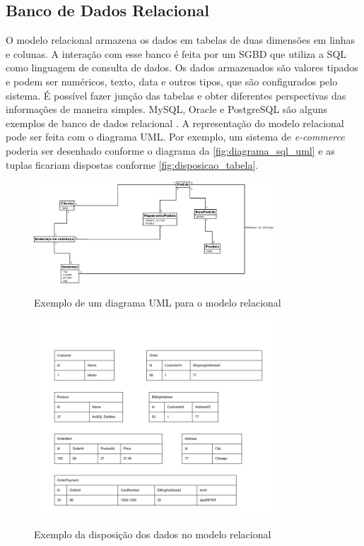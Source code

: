 \subsection{Banco de Dados Relacional}
\label{subsec:relationaldatabasetype}
O modelo relacional armazena os dados em tabelas de duas dimensões em linhas e colunas. A interação com esse banco é feita por um \ac{SGBD} que utiliza a \ac{SQL} como linguagem de consulta de dados. Os dados armazenados são valores tipados e podem ser numéricos, texto, data e outros tipos, que são configurados pelo sistema. É possível fazer junção das tabelas e obter diferentes perspectivas das informações de maneira simples. MySQL, Oracle e PostgreSQL são alguns exemplos de banco de dados relacional \cite{SDSW}.
A representação do modelo relacional pode ser feita com o diagrama \ac{UML}. Por exemplo, um sistema de \textit{e-commerce} poderia ser desenhado conforme o diagrama da \autoref{fig:diagrama_sql_uml} e as tuplas ficariam dispostas conforme \autoref{fig:disposicao_tabela}.
\begin{figure}[H]
    \centering
    \caption{Exemplo de um diagrama \ac{UML} para o modelo relacional}
    \includegraphics[width=0.8\textwidth]{./04-figuras/diagrama_sql_uml.jpg}
    \label{fig:diagrama_sql_uml}
\end{figure}
\begin{figure}[H]
    \centering
    \caption{Exemplo da disposição dos dados no modelo relacional}
    \includegraphics[width=0.8\textwidth]{./04-figuras/disposicao_dados_tabela.png}
    \label{fig:disposicao_tabela}
\end{figure}



